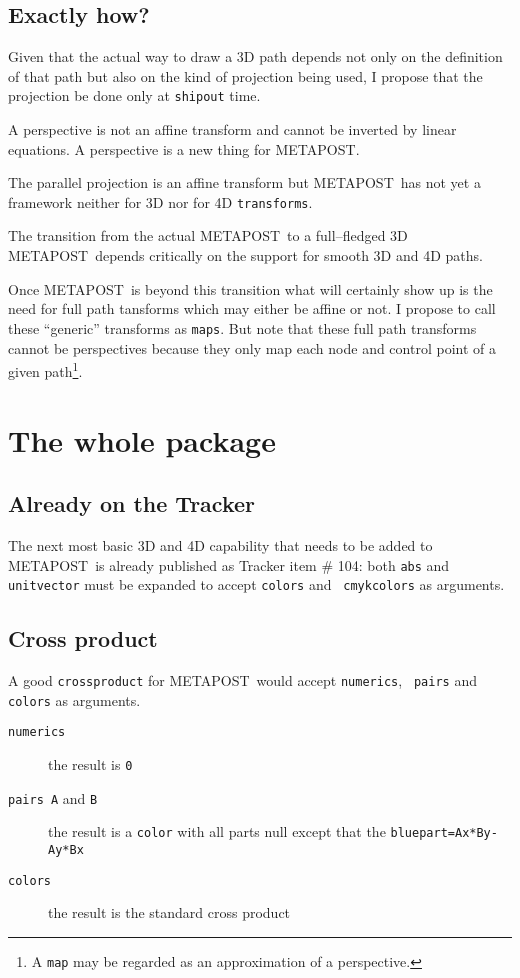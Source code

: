 \documentclass{article}
\newcommand{\MP}{{\normald METAPOST}}
\begin{document}
\subsection{Exactly how?}
 
Given that the actual way to draw a 3D path depends not only on the
definition of that path but also on the kind of projection being used,
I propose that the projection be done only at {\tt shipout} time.

A perspective is not an affine transform and cannot be inverted by
linear equations. A perspective is a new thing for \MP. 

The parallel projection is an affine transform but \MP\ has not yet a
framework neither for 3D nor for 4D {\tt transforms}.

The transition from the actual \MP\ to a full--fledged 3D \MP\ depends
critically on the support for smooth 3D and 4D paths. 

Once \MP\ is beyond this
transition what will certainly show up is the need for full path
tansforms which may either be affine or not. I propose to call these
``generic'' transforms as {\tt maps}. But note that these full path
transforms cannot be perspectives because they only map each node and
control point of a given path\footnote{A {\tt map} may be regarded as
  an approximation of a perspective.}. 

\section{The whole package}

\subsection{Already on the Tracker}

The next most basic 3D and 4D capability that needs to be added to
\MP\ is already published as Tracker item \# 104: both {\tt abs} and
{\tt unitvector} must be expanded to accept {\tt colors} and {\tt
  cmykcolors} as arguments.

\subsection{Cross product}

A good {\tt crossproduct} for \MP\ would accept {\tt numerics}, {\tt
  pairs} and {\tt colors} as arguments.
\begin{description}
  \item[{\tt numerics}] the result is {\tt 0}
  \item[{\tt  pairs A} and {\tt B}] the result is a {\tt color} with
    all parts null except that the {\tt bluepart=Ax*By-Ay*Bx}
  \item[{\tt colors}] the result is the standard cross product
\end{description}
\end{document}
